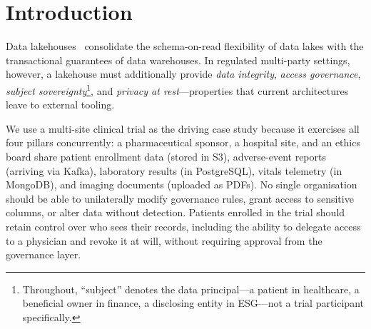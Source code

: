 \documentclass[10pt,twocolumn]{article}
\begin{document}
\begin{abstract}
We use a multi-site clinical trial as the driving case study
because it exercises all four pillars concurrently, but the
mechanisms are domain-agnostic; \S\ref{sec:applicability}
sketches how the same design applies to trade reporting, ESG
disclosure, and cross-institution research with only the
sensitive-column registry and policy pack changing. We validate
the design against a Hyperledger Besu (QBFT) network with a
830-line Solidity contract deployed and a Flask backend running
in \texttt{mode=on-chain}, exercised through a benchmark artefact
(\texttt{scripts/bench\_full.py}) that hits the real contract.
Measured mean end-to-end query overhead over raw DuckDB on five
federated datasets is 10--21\% (approximately 0.3--1.0\,ms);
Merkle build scales linearly from 0.06\,ms at 10 rows to 232\,ms
at 50k rows; a real on-chain ingestion anchor round-trip (signed
transaction plus block inclusion) takes a mean of 23\,ms.
Against a centralised IAM baseline (plain RBAC, no chain, no
Merkle), V-Lake adds roughly 1\,ms per query plus a one-time
per-ingestion blockchain cost of tens of milliseconds. A test
suite exercises seven modelled adversary classes; we do not
claim formal security proofs or regulatory certification.
\end{abstract}

\section{Introduction}
\label{sec:intro}

Data lakehouses~\cite{armbrust2021lakehouse} consolidate the
schema-on-read flexibility of data lakes with the transactional
guarantees of data warehouses. In regulated multi-party settings,
however, a lakehouse must additionally provide \emph{data
integrity}, \emph{access governance}, \emph{subject
sovereignty}\footnote{Throughout, ``subject'' denotes the data
principal---a patient in healthcare, a beneficial owner in finance,
a disclosing entity in ESG---not a trial participant specifically.},
and \emph{privacy at rest}---properties that current architectures
leave to external tooling.

We use a multi-site clinical trial as the driving case study
because it exercises all four pillars concurrently: a pharmaceutical
sponsor, a hospital site, and an ethics board share patient
enrollment data (stored in S3), adverse-event reports (arriving via
Kafka), laboratory results (in PostgreSQL), vitals telemetry (in
MongoDB), and imaging documents (uploaded as PDFs). No single
organisation should be able to unilaterally modify governance
rules, grant access to sensitive columns, or alter data without
detection. Patients enrolled in the trial should retain control
over who sees their records, including the ability to delegate
access to a physician and revoke it at will, without requiring
approval from the governance layer.
\end{document}
